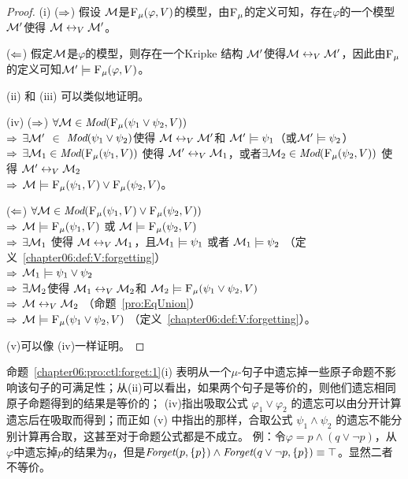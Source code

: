 \begin{proof}
	(i) ($\Rightarrow$) 假设 ${\cal M}$是${\textsc{F}_{\textsc{$\mu$}}}(\varphi, V)$的模型，由${\textsc{F}_{\textsc{$\mu$}}}$的定义可知，存在$\varphi$的一个模型${\cal M}'$使得 ${\cal M} \leftrightarrow_V {\cal M}'$。
	
	($\Leftarrow$) 假定${\cal M}$是$\varphi$的模型，则存在一个Kripke 结构 ${\cal M}'$使得${\cal M} \leftrightarrow_V {\cal M}'$，因此由${\textsc{F}_{\textsc{$\mu$}}}$的定义可知${\cal M}' \models {\textsc{F}_{\textsc{$\mu$}}}(\varphi, V)$。
	
	(ii) 和 (iii) 可以类似地证明。
	
	(iv) ($\Rightarrow$) $\forall {\cal M}\in \textit{Mod}({\textsc{F}_{\textsc{$\mu$}}}(\psi_1 \vee \psi_2, V))$\\
	$\Rightarrow$ $\exists {\cal M}'$ $\in$  $\textit{Mod}(\psi_1\vee \psi_2)$使得 ${\cal M} \leftrightarrow_V {\cal M}'$和 ${\cal M}' \models \psi_1$（或${\cal M}' \models \psi_2$） \\
	$\Rightarrow$ $\exists {\cal M}_1 \in \textit{Mod}({\textsc{F}_{\textsc{$\mu$}}}(\psi_1, V))$ 使得 ${\cal M}' \leftrightarrow_V {\cal M}_1$，或者$\exists{\cal M}_2 \in \textit{Mod}({\textsc{F}_{\textsc{$\mu$}}}(\psi_2, V))$ 使得 ${\cal M}' \leftrightarrow_V {\cal M}_2$ \\
	$\Rightarrow$ ${\cal M} \models {\textsc{F}_{\textsc{$\mu$}}}(\psi_1, V) \vee {\textsc{F}_{\textsc{$\mu$}}}(\psi_2, V)$。
	
	($\Leftarrow$) $\forall {\cal M} \in \textit{Mod}({\textsc{F}_{\textsc{$\mu$}}}(\psi_1, V) \vee {\textsc{F}_{\textsc{$\mu$}}}(\psi_2, V))$\\
	$\Rightarrow$ ${\cal M} \models {\textsc{F}_{\textsc{$\mu$}}}(\psi_1,V)$ 或 ${\cal M} \models {\textsc{F}_{\textsc{$\mu$}}}(\psi_2,V)$\\
	$\Rightarrow$ $\exists {\cal M}_1$ 使得 ${\cal M} \leftrightarrow_V {\cal M}_1$，且${\cal M}_1 \models \psi_1$ 或者 ${\cal M}_1 \models \psi_2$ \hfill （定义~\ref{chapter06:def:V:forgetting}）\\
	$\Rightarrow$ ${\cal M}_1 \models \psi_1 \vee \psi_2$\\
	$\Rightarrow$ $\exists {\cal M}_2$使得 ${\cal M}_1 \leftrightarrow_V {\cal M}_2$和 ${\cal M}_2 \models {\textsc{F}_{\textsc{$\mu$}}}(\psi_1 \vee \psi_2, V)$\\
	$\Rightarrow$ ${\cal M} \leftrightarrow_V {\cal M}_2$ （命题~\ref{pro:EqUnion}）\\
	$\Rightarrow$ ${\cal M} \models {\textsc{F}_{\textsc{$\mu$}}}(\psi_1 \vee \psi_2, V)$ （定义~\ref{chapter06:def:V:forgetting}）。
	
	 (v)可以像 (iv)一样证明。
\end{proof}

命题~\ref{chapter06:pro:ctl:forget:1}(i) 表明从一个$\mu$-句子中遗忘掉一些原子命题不影响该句子的可满足性；从(ii)可以看出，如果两个句子是等价的，则他们遗忘相同原子命题得到的结果是等价的； (iv)指出吸取公式 $\varphi_1 \vee \varphi_2$ 的遗忘可以由分开计算遗忘后在吸取而得到；而正如 (v) 中指出的那样，合取公式 $\psi_1 \wedge \psi_2$ 的遗忘不能分别计算再合取，这甚至对于命题公式都是不成立。
例：令$\varphi=p \wedge (q \vee \neg p)$，从$\varphi$中遗忘掉$p$的结果为$q$，但是$\textit{Forget}(p, \{p\}) \wedge \textit{Forget}(q\vee \neg p, \{p\}) \equiv \top$。显然二者不等价。

